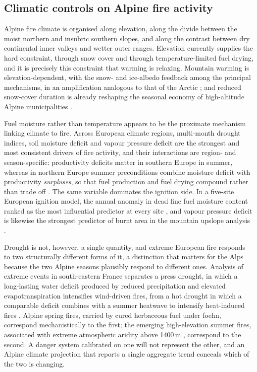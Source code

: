\documentclass[11pt,a4paper]{article}
\begin{document}
\subsection{Climatic controls on Alpine fire activity}

Alpine fire climate is organised along elevation, along the divide between the moist northern and insubric southern slopes, and along the contrast between dry continental inner valleys and wetter outer ranges. Elevation currently supplies the hard constraint, through snow cover and through temperature-limited fuel drying, and it is precisely this constraint that warming is relaxing. Mountain warming is elevation-dependent, with the snow- and ice-albedo feedback among the principal mechanisms, in an amplification analogous to that of the Arctic \citep{rangwala_climate_2012}; and reduced snow-cover duration is already reshaping the seasonal economy of high-altitude Alpine municipalities \citep{pede_mountain_2022}.

Fuel moisture rather than temperature appears to be the proximate mechanism linking climate to fire. Across European climate regions, multi-month drought indices, soil moisture deficit and vapour pressure deficit are the strongest and most consistent drivers of fire activity, and their interactions are region- and season-specific: productivity deficits matter in southern Europe in summer, whereas in northern Europe summer preconditions combine moisture deficit with productivity \emph{surpluses}, so that fuel production and fuel drying compound rather than trade off \citep{miller_compounding_2025}. The same variable dominates the ignition side. In a five-site European ignition model, the annual anomaly in dead fine fuel moisture content ranked as the most influential predictor at every site \citep{gelabert_assessing_2025}, and vapour pressure deficit is likewise the strongest predictor of burnt area in the mountain upslope analysis \citep{beloiu_climatedriven_2026}.

Drought is not, however, a single quantity, and extreme European fire responds to two structurally different forms of it, a distinction that matters for the Alps because the two Alpine seasons plausibly respond to different ones. Analysis of extreme events in south-eastern France separates a press drought, in which a long-lasting water deficit produced by reduced precipitation and elevated evapotranspiration intensifies wind-driven fires, from a hot drought in which a comparable deficit combines with a summer heatwave to intensify heat-induced fires \citep{ruffault_extreme_2018}. Alpine spring fires, carried by cured herbaceous fuel under foehn, correspond mechanistically to the first; the emerging high-elevation summer fires, associated with extreme atmospheric aridity above 1400\,m \citep{beloiu_climatedriven_2026}, correspond to the second. A danger system calibrated on one will not represent the other, and an Alpine climate projection that reports a single aggregate trend conceals which of the two is changing.
\end{document}
